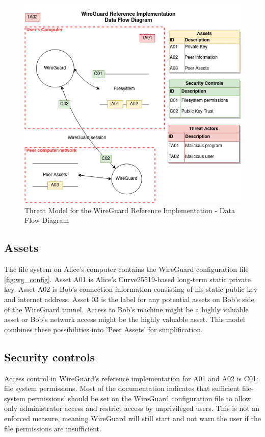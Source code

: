 \documentclass [11pt, proquest] {uwthesis}[2020/02/24]
\begin{document}
\begin{figure}[ht]
\includegraphics[width=14cm]{paper/images/WGH_DFD.png}
\caption{Threat Model for the WireGuard Reference Implementation - Data Flow Diagram}
\label{fig:wg_ref_dfd}
\end{figure}

\subsection{Assets}
The file system on Alice's computer contains the WireGuard configuration file \ref{fig:wg_config}. 
Asset A01 is Alice's Curve25519-based long-term static private key. Asset A02 is Bob's connection information consisting of his static public key and internet address. 
Asset 03 is the label for any potential assets on Bob's side of the WireGuard tunnel. Access to Bob's machine might be a highly valuable asset or Bob's network access might be the highly valuable asset. This model combines these possibilities into 'Peer Assets' for simplification.

\subsection{Security controls}
Access control in WireGuard's reference implementation for A01 and A02 is C01: file system permissions. Most of the documentation indicates that sufficient file-system permissions' should be set on the WireGuard configuration file to allow only administrator access and restrict access by unprivileged users. This is not an enforced measure, meaning WireGuard will still start and not warn the user if the file permissions are insufficient. 
\end{document}
